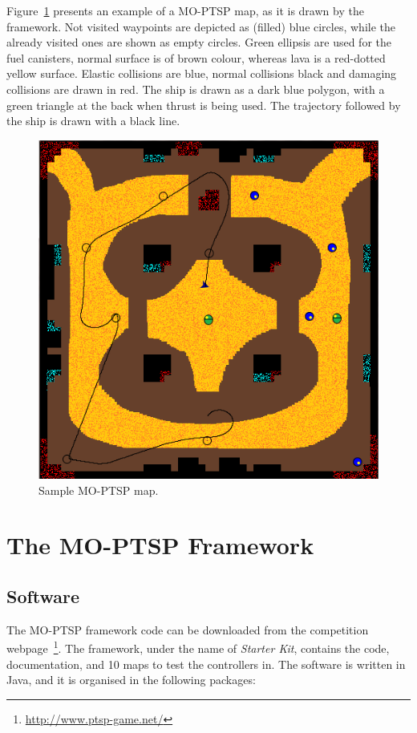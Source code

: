 \documentclass[conference]{IEEEtran}
\begin{document}
Figure~\ref{fig:sampleMap} presents an example of a MO-PTSP map, as it is drawn by the framework. Not visited waypoints are depicted as (filled) blue circles, while the already visited ones are shown as empty circles. Green ellipsis are used for the fuel canisters,  normal surface is of brown colour, whereas lava is a red-dotted yellow surface. Elastic collisions are blue, normal collisions black and damaging collisions are drawn in red. The ship is drawn as a dark blue polygon, with a green triangle at the back when thrust is being used. The trajectory followed by the ship is drawn with a black line.

\begin{figure} [!h]
	\begin{center}
	\includegraphics[width=0.7\columnwidth]{img/sampleMap}
	\caption{Sample MO-PTSP map.}
	\label{fig:sampleMap}
	\end{center}
\end{figure}


\section{The MO-PTSP Framework} \label{sec:contr}


\subsection{Software} \label{ssec:software}

The MO-PTSP framework code can be downloaded from the competition webpage~\footnote{\url{http://www.ptsp-game.net/}}. The framework, under the name of \textit{Starter Kit}, contains the code, documentation, and 10 maps to test the controllers in. The software is written in Java, and it is organised in the following packages:
\end{document}
